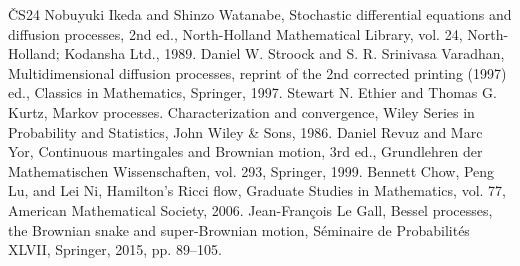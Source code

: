 \documentclass[10pt]{amsart}
\theoremstyle{definition}\newtheorem{defi}[theo]{Definition}\newtheorem{rema}[theo]{Remark}\newtheorem{exam}[theo]{Example}\newtheorem{exem}[theo]{Example}\newtheorem{nota}[theo]{Notation}
\begin{document}
\begin{thebibliography}{ČS24}
 Nobuyuki Ikeda and Shinzo Watanabe, Stochastic differential equations and diffusion processes, 2nd ed., North-Holland Mathematical Library, vol. 24, North-Holland; Kodansha Ltd., 1989.
 Daniel W. Stroock and S. R. Srinivasa Varadhan, Multidimensional diffusion processes, reprint of the 2nd corrected printing (1997) ed., Classics in Mathematics, Springer, 1997.
 Stewart N. Ethier and Thomas G. Kurtz, Markov processes. Characterization and convergence, Wiley Series in Probability and Statistics, John Wiley \& Sons, 1986.
 Daniel Revuz and Marc Yor, Continuous martingales and Brownian motion, 3rd ed., Grundlehren der Mathematischen Wissenschaften, vol. 293, Springer, 1999.
 Bennett Chow, Peng Lu, and Lei Ni, Hamilton’s Ricci flow, Graduate Studies in Mathematics, vol. 77, American Mathematical Society, 2006.
 Jean-François Le Gall, Bessel processes, the Brownian snake and super-Brownian motion, Séminaire de Probabilités XLVII, Springer, 2015, pp. 89–105.
\end{thebibliography}
\end{document}
